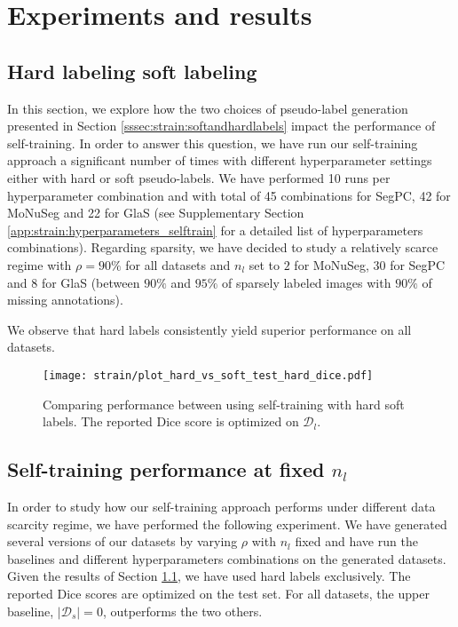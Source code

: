 \section{Experiments and results}
\label{sec:strain:results}

\subsection{Hard labeling \vs soft labeling}
\label{ssec:strain:res:hardvssoft}

In this section, we explore how the two choices of pseudo-label generation presented in Section \ref{sssec:strain:softandhardlabels} impact the performance of self-training. In order to answer this question, we have run our self-training approach a significant number of times with different hyperparameter settings either with hard or soft pseudo-labels. We have performed 10 runs per hyperparameter combination and with total of 45 combinations for SegPC, 42 for MoNuSeg and 22 for GlaS (see Supplementary Section \ref{app:strain:hyperparameters_selftrain} for a detailed list of hyperparameters combinations). Regarding sparsity, we have decided to study a relatively scarce regime with $\rho = 90\%$ for all datasets and $n_l$ set to $2$ for MoNuSeg, $30$ for SegPC and $8$ for GlaS (\ie between $90\%$ and $95\%$ of sparsely labeled images with $90\%$ of missing annotations).    

We observe that hard labels consistently yield superior performance on all datasets. 

\begin{figure}
  \centering
  \texttt{[image: strain/plot\_hard\_vs\_soft\_test\_hard\_dice.pdf]}
  \caption{Comparing performance between using self-training with hard \vs soft labels. The reported Dice score is optimized on $\mathcal{D}_l$.}
  \label{fig:strain:hard_vs_soft}
\end{figure}

\subsection{Self-training performance at fixed $n_l$}

In order to study how our self-training approach performs under different data scarcity regime, we have performed the following experiment. We have generated several versions of our datasets by varying $\rho$ with $n_l$ fixed and have run the baselines and different hyperparameters combinations on the generated datasets. Given the results of Section \ref{ssec:strain:res:hardvssoft}, we have used hard labels exclusively. The reported Dice scores are optimized on the test set. For all datasets, the upper baseline, $|\mathcal{D}_s| = 0$, outperforms the two others. 

